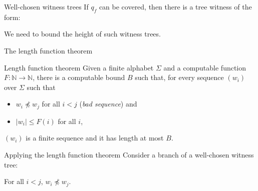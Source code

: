 \documentclass{beamer}
\begin{document}
\begin{frame}{Well-chosen witness trees}
If $q_f$ can be covered, then there is a tree witness of the form:
\begin{center}
\resizebox{!}{5.5cm}{

}
\end{center}

\pause 
We need to bound the height of such witness trees.
\end{frame}

\begin{frame}{The length function theorem} 
\begin{block}{Length function theorem\footnotemark}
	Given a finite alphabet $\Sigma$ and a computable function $F : \mathbb{N} \to \mathbb{N}$, there is a computable bound $B$ such that, for every sequence $(w_i)$ over $\Sigma$ such that
	\begin{itemize}
		\item $w_i \npreceq w_j$ for all $i<j$ (\emph{bad sequence}) and
		\item $|w_i| \leq F(i)$ for all $i$,
	\end{itemize}
$(w_i)$ is a finite sequence and it has length at most $B$.
\end{block}
\end{frame}



\begin{frame}{Applying the length function theorem}
Consider a branch of a well-chosen witness tree: \vspace{0.2cm} 

\begin{center}
\resizebox{!}{4cm}{

}
\end{center}
For all $i < j$, $w_i \npreceq w_j$. 

\end{frame}

\end{document}
